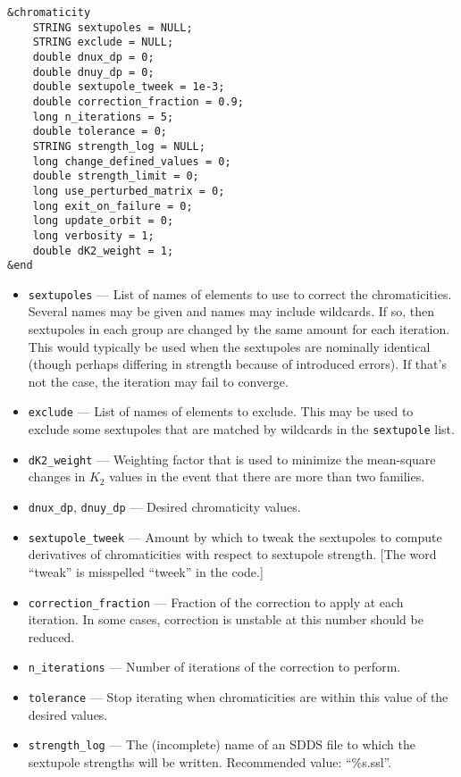 \documentclass[11pt]{article}
\begin{document}
\begin{verbatim}
&chromaticity
    STRING sextupoles = NULL;
    STRING exclude = NULL;
    double dnux_dp = 0;
    double dnuy_dp = 0;
    double sextupole_tweek = 1e-3;
    double correction_fraction = 0.9;
    long n_iterations = 5;
    double tolerance = 0;
    STRING strength_log = NULL;
    long change_defined_values = 0;
    double strength_limit = 0;
    long use_perturbed_matrix = 0;    
    long exit_on_failure = 0;
    long update_orbit = 0;
    long verbosity = 1;
    double dK2_weight = 1;
&end
\end{verbatim}

\begin{itemize}
\item \verb|sextupoles| --- List of names of elements to use to correct the chromaticities.  Several names may be given and names may include
  wildcards. If so, then sextupoles in each group are changed by the same amount for each iteration.
  This would typically be used when the sextupoles are nominally identical (though perhaps differing in strength because of
  introduced errors). If that's not the case, the iteration may fail to converge.
\item \verb|exclude| --- List of names of elements to exclude. This may be used to exclude some sextupoles that are matched by wildcards in
  the \verb|sextupole| list.
\item \verb|dK2_weight| --- Weighting factor that is used to minimize the mean-square changes in $K_2$ values in the
  event that there are more than two families.
\item \verb|dnux_dp|, \verb|dnuy_dp| --- Desired chromaticity values.
\item \verb|sextupole_tweek| --- Amount by which to tweak the sextupoles to compute derivatives of
chromaticities with respect to sextupole strength.  [The word ``tweak'' is misspelled ``tweek'' in the code.]
\item \verb|correction_fraction| --- Fraction of the correction to apply at each iteration.  In some
cases, correction is unstable at this number should be reduced.
\item \verb|n_iterations| --- Number of iterations of the correction to perform.
\item \verb|tolerance| --- Stop iterating when chromaticities are within this value of the
desired values.
\item \verb|strength_log| --- The (incomplete) name of an SDDS file to which the sextupole strengths will
be written.  Recommended value: ``\%s.ssl''.

\end{itemize}
\end{document}
